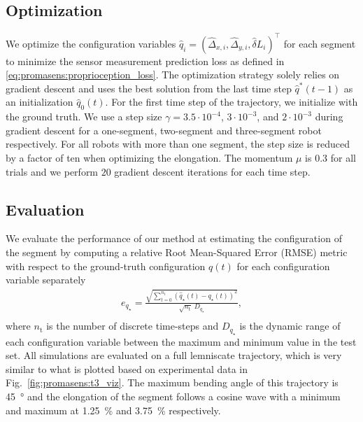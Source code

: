 \subsection{Optimization}
We optimize the configuration variables $\hat{q}_i = (\hat{\Delta}_{x,i}, \hat{\Delta}_{y,i}, \hat{\delta} L_{i})^\top$ for each segment to minimize the sensor measurement prediction loss as defined in \eqref{eq:promasens:proprioception_loss}.
The optimization strategy solely relies on gradient descent and uses the best solution from the last time step $\hat{q}^*(t-1)$ as an initialization $\hat{q}_0(t)$. For the first time step of the trajectory, we initialize with the ground truth.
We use a step size $\gamma = 3.5 \cdot 10^{-4}$, $3 \cdot 10^{-3}$, and $2 \cdot 10^{-3}$ during gradient descent for a one-segment, two-segment and three-segment robot respectively. For all robots with more than one segment, the step size is reduced by a factor of ten when optimizing the elongation. The momentum $\mu$ is $0.3$ for all trials and we perform $20$ gradient descent iterations for each time step.

\subsection{Evaluation}\label{sub:promasens:pcc_simulations:evaluation}
We evaluate the performance of our method at estimating the configuration of the segment by computing a relative Root Mean-Squared Error (RMSE) metric with respect to the ground-truth configuration $q(t)$ for each configuration variable separately
\begin{equation}\label{eq:promasens:relative_RMSE}
\begin{split}
    e_{q_\star} = \frac{\sqrt{\sum_{t=0}^{n_\mathrm{t}} \left ( \hat{q}_\star(t) - q_\star(t) \right )^2}}{\sqrt{n_\mathrm{t}} \; D_{q_\star}},\\
\end{split}
\end{equation}
where $n_\mathrm{t}$ is the number of discrete time-steps and $D_{q_\star}$ is the dynamic range of each configuration variable between the maximum and minimum value in the test set.
All simulations are evaluated on a full lemniscate trajectory, which is very similar to what is plotted based on experimental data in Fig.~\ref{fig:promasens:t3_viz}. The maximum bending angle of this trajectory is \SI{45}{\degree} and the elongation of the segment follows a cosine wave with a minimum and maximum at \SI{1.25}{\percent} and \SI{3.75}{\percent} respectively.

